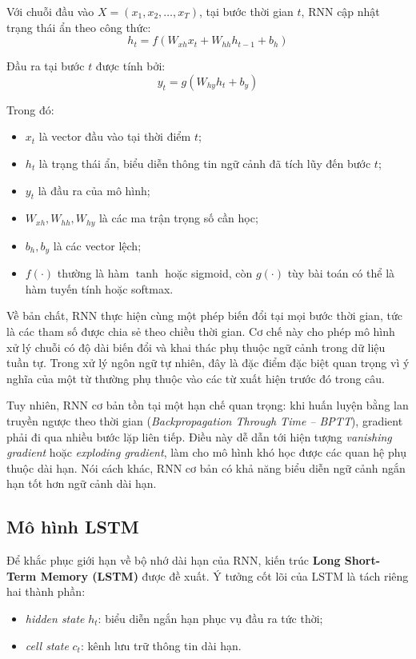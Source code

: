 \documentclass[a4paper,12pt,twoside]{report}
\begin{document}
Với chuỗi đầu vào $X = (x_1, x_2, \dots, x_T)$, tại bước thời gian $t$, RNN cập nhật trạng thái ẩn theo công thức:
\begin{equation}
h_t = f(W_{xh}x_t + W_{hh}h_{t-1} + b_h)
\end{equation}

Đầu ra tại bước $t$ được tính bởi:
\begin{equation}
y_t = g(W_{hy}h_t + b_y)
\end{equation}

Trong đó:
\begin{itemize}
    \item $x_t$ là vector đầu vào tại thời điểm $t$;
    \item $h_t$ là trạng thái ẩn, biểu diễn thông tin ngữ cảnh đã tích lũy đến bước $t$;
    \item $y_t$ là đầu ra của mô hình;
    \item $W_{xh}, W_{hh}, W_{hy}$ là các ma trận trọng số cần học;
    \item $b_h, b_y$ là các vector lệch;
    \item $f(\cdot)$ thường là hàm $\tanh$ hoặc sigmoid, còn $g(\cdot)$ tùy bài toán có thể là hàm tuyến tính hoặc softmax.
\end{itemize}

Về bản chất, RNN thực hiện cùng một phép biến đổi tại mọi bước thời gian, tức là các tham số được chia sẻ theo chiều thời gian. Cơ chế này cho phép mô hình xử lý chuỗi có độ dài biến đổi và khai thác phụ thuộc ngữ cảnh trong dữ liệu tuần tự. Trong xử lý ngôn ngữ tự nhiên, đây là đặc điểm đặc biệt quan trọng vì ý nghĩa của một từ thường phụ thuộc vào các từ xuất hiện trước đó trong câu.

Tuy nhiên, RNN cơ bản tồn tại một hạn chế quan trọng: khi huấn luyện bằng lan truyền ngược theo thời gian (\textit{Backpropagation Through Time -- BPTT}), gradient phải đi qua nhiều bước lặp liên tiếp. Điều này dễ dẫn tới hiện tượng \textit{vanishing gradient} hoặc \textit{exploding gradient}, làm cho mô hình khó học được các quan hệ phụ thuộc dài hạn. Nói cách khác, RNN cơ bản có khả năng biểu diễn ngữ cảnh ngắn hạn tốt hơn ngữ cảnh dài hạn.

\subsection{Mô hình LSTM}

Để khắc phục giới hạn về bộ nhớ dài hạn của RNN, kiến trúc \textbf{Long Short-Term Memory (LSTM)} được đề xuất. Ý tưởng cốt lõi của LSTM là tách riêng hai thành phần:
\begin{itemize}
    \item \textit{hidden state} $h_t$: biểu diễn ngắn hạn phục vụ đầu ra tức thời;
    \item \textit{cell state} $c_t$: kênh lưu trữ thông tin dài hạn.
\end{itemize}
\end{document}
